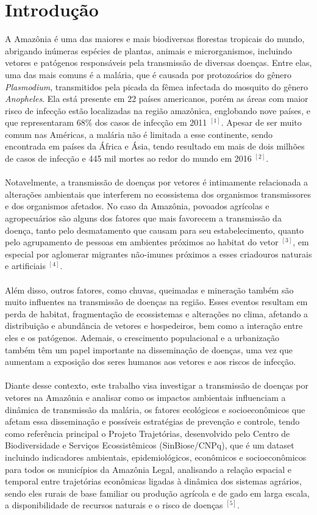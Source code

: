 \chapter{Introdução}

A Amazônia é uma das maiores e mais biodiversas florestas tropicais do mundo, 
abrigando inúmeras espécies de plantas, animais e microrganismos, incluindo 
vetores e patógenos responsáveis pela transmissão de diversas doenças. Entre 
elas, uma das mais comuns é a malária, que é causada por protozoários do 
gênero \textit{Plasmodium}, transmitidos pela picada da fêmea infectada do 
mosquito do gênero \textit{Anopheles}. Ela está presente em 22 países 
americanos, porém as áreas com maior risco de infecção estão localizadas 
na região amazônica, englobando nove países, e que representaram $68\%$ 
dos casos de infecção em 2011 $^{[1]}$. Apesar de ser muito comum nas 
Américas, a malária não é limitada a esse continente, sendo encontrada 
em países da África e Ásia, tendo resultado em mais de dois milhões de 
casos de infecção e  445 mil mortes ao redor do mundo em 2016 $^{[2]}$.    
\\\\
Notavelmente, a transmissão de doenças por vetores é intimamente relacionada 
a alterações ambientais que interferem no ecossistema dos organismos 
transmissores e dos organismos afetados. No caso da Amazônia, povoados 
agrícolas e agropecuários são alguns dos fatores que mais favorecem a 
transmissão da doença, tanto pelo desmatamento que causam para seu 
estabelecimento, quanto pelo agrupamento de pessoas em ambientes 
próximos ao habitat do vetor $^{[3]}$, em especial por aglomerar migrantes 
não-imunes próximos a esses criadouros naturais e artificiais $^{[4]}$. 
\\\\
Além disso, outros fatores, 
como chuvas, queimadas e mineração também são muito influentes na 
transmissão de doenças na região. Esses eventos resultam em perda 
de habitat, fragmentação de ecossistemas e alterações no clima, 
afetando a distribuição e abundância de vetores e hospedeiros, bem 
como a interação entre eles e os patógenos. Ademais, o crescimento 
populacional e a urbanização também têm um papel importante na disseminação 
de doenças, uma vez que aumentam a exposição dos seres humanos aos vetores 
e aos riscos de infecção.
\\\\
Diante desse contexto, este trabalho visa investigar a transmissão de 
doenças por vetores na Amazônia e analisar como os impactos ambientais 
influenciam a dinâmica de transmissão da malária, os fatores ecológicos 
e socioeconômicos que afetam essa disseminação e possíveis estratégias 
de prevenção e controle, tendo como referência principal o Projeto 
Trajetórias, desenvolvido pelo Centro de Biodiversidade e Serviços Ecossistêmicos (SinBiose/CNPq), que é um dataset incluindo 
indicadores ambientais, epidemiológicos, econômicos e socioeconômicos 
para todos os municípios da Amazônia Legal, analisando a relação espacial 
e temporal entre trajetórias econômicas ligadas à dinâmica dos sistemas 
agrários, sendo eles rurais de base familiar ou produção agrícola e de 
gado em larga escala, a disponibilidade de recursos naturais e o risco 
de doenças $^{[5]}$.